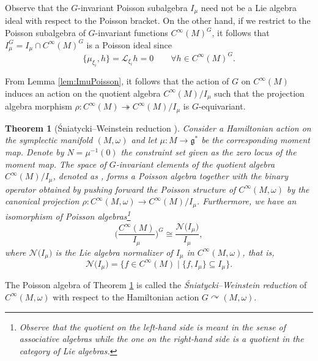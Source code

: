 \documentclass[10pt,a4paper]{amsart}
\numberwithin{equation}{section}
\newtheorem{Theorem}{Theorem}[section]
\DeclareMathOperator{\action}{\curvearrowright}
\newcommand{\g}{\mathfrak{g}}
\renewcommand{\L}{\mathscr{L}}
\renewcommand{\subset}{\subseteq}
\begin{document}
\begin{Remark}
	Observe that the $G$-invariant Poisson subalgebra $I_\mu$ need not be a Lie algebra ideal with respect to the Poisson bracket.
	On the other hand, if we restrict to the Poisson subalgebra of $G$-invariant functions $C^\infty(M)^G$, it follows that $I_{\mu}^G = I_\mu \cap C^\infty(M)^G$ is a Poisson ideal since
	\[
		\bigl\lbrace	\mu_{\xi_i} , h \bigr\rbrace = \L_{\xi_i} h = 0
		\qquad \forall h \in C^\infty(M)^G.
	\]
\end{Remark}

From Lemma \ref{lem:ImuPoisson}, it follows that the action of $G$ on $C^\infty(M)$ induces an action on the quotient algebra $C^\infty(M)/I_\mu$ such that the projection algebra morphism $\rho\colon  C^\infty(M) \twoheadrightarrow C^\infty(M)/I_{\mu}$ is $G$-equivariant.

\begin{Theorem}[\'Sniatycki--Weinstein reduction \cite{SniatyckiWeinstein83}]\label{thm:SW-red}
 Consider a Hamiltonian action on the symplectic manifold $(M,\omega)$ and let $\mu\colon M\to\g^*$ be the corresponding moment map.
 Denote by $N=\mu^{-1}(0)$ the constraint set given as the zero locus of the moment map.
 The space of $G$-invariant elements of the quotient algebra $C^\infty(M)/I_\mu$, denoted as ,
 forms a Poisson algebra together with the binary operator obtained by pushing forward the Poisson structure of $C^\infty(M,\omega)$ by the canonical projection $\rho\colon  C^\infty(M,\omega) \to C^\infty(M)/I_\mu$.
	Furthermore, we have an isomorphism of Poisson algebras\footnote{Observe that the quotient on the left-hand side is meant in the sense of associative algebras while the one on the right-hand side is a quotient in the category of Lie algebras.}
	\begin{displaymath}
		\biggl(\frac{C^\infty(M)}{I_{\mu}}\biggr)^G \cong
		\frac{\mathcal{N}\bigl(I_\mu\bigr)}{I_\mu},
	\end{displaymath}
	where $\mathcal{N}\bigl(I_\mu\bigr)$ is the Lie algebra normalizer of $I_\mu$ in $C^\infty(M,\omega)$, that is,
	\begin{equation}\label{eq:ImuNorm}
		\mathcal{N}\bigl(I_\mu\bigr) =
		\bigl\lbrace
 		f \in C^\infty(M)
 		\mid
		\bigl\lbrace f, I_\mu \bigr\rbrace \subset I_\mu
 		\bigr\rbrace 		.
	\end{equation}
\end{Theorem}

\begin{Definition}
	The Poisson algebra  of Theorem \ref{thm:SW-red} is called the \emph{\'Sniatycki--Weinstein reduction} of $C^\infty(M,\omega)$ with respect to the Hamiltonian action $G\action (M,\omega)$.
\end{Definition}
\end{document}
